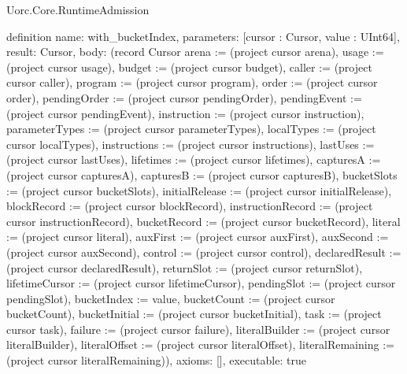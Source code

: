 \begin{lexlean}{Uorc.Core.RuntimeAdmission}
\begin{semanticmodule}
definition{
  name: with_bucketIndex,
  parameters: [cursor : Cursor, value : UInt64],
  result: Cursor,
  body: (record Cursor {arena := (project cursor arena), usage := (project cursor usage), budget := (project cursor budget), caller := (project cursor caller), program := (project cursor program), order := (project cursor order), pendingOrder := (project cursor pendingOrder), pendingEvent := (project cursor pendingEvent), instruction := (project cursor instruction), parameterTypes := (project cursor parameterTypes), localTypes := (project cursor localTypes), instructions := (project cursor instructions), lastUses := (project cursor lastUses), lifetimes := (project cursor lifetimes), capturesA := (project cursor capturesA), capturesB := (project cursor capturesB), bucketSlots := (project cursor bucketSlots), initialRelease := (project cursor initialRelease), blockRecord := (project cursor blockRecord), instructionRecord := (project cursor instructionRecord), bucketRecord := (project cursor bucketRecord), literal := (project cursor literal), auxFirst := (project cursor auxFirst), auxSecond := (project cursor auxSecond), control := (project cursor control), declaredResult := (project cursor declaredResult), returnSlot := (project cursor returnSlot), lifetimeCursor := (project cursor lifetimeCursor), pendingSlot := (project cursor pendingSlot), bucketIndex := value, bucketCount := (project cursor bucketCount), bucketInitial := (project cursor bucketInitial), task := (project cursor task), failure := (project cursor failure), literalBuilder := (project cursor literalBuilder), literalOffset := (project cursor literalOffset), literalRemaining := (project cursor literalRemaining)}),
  axioms: [],
  executable: true
}


\end{semanticmodule}
\end{lexlean}
